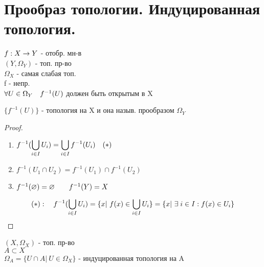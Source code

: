 \documentclass[geometry.tex]{subfiles}
\begin{document}
  \section{Прообраз топологии. Индуцированная топология.}

  \begin{definition}
      $f: X \rightarrow Y$ - отобр. мн-в\\
      $(Y, \Omega_Y)$ - топ. пр-во\\
      $\Omega_X$ - самая слабая топ.\\
      f - непр.\\
      $\forall U \in \Omega_Y \quad f^{-1}(U)$ должен быть открытым в X
  \end{definition}
  \begin{theorem}
      $\{f^{-1}(U)\}$ - топология на X и она назыв. прообразом $\Omega_Y$
  \end{theorem}

  \begin{proof}
      \begin{enumerate}
          \item $\displaystyle f^{-1}(\bigcup_{i \in I} U_i) = \bigcup_{i \in I} f^{-1}(U_i) \quad (*)$
          \item $f^{-1}(U_1 \cap U_2) = f^{-1}(U_1) \cap f^{-1}(U_2)$
          \item $f^{-1}(\varnothing) = \varnothing \quad\quad f^{-1}(Y) = X$
      \end{enumerate}
      \[(*): \quad f^{-1}(\bigcup_{i \in I} U_i) = \{x | \ f(x) \in \bigcup_{i \in I} U_i\} =
      \{x | \ \exists \; i \in I: f(x) \in U_i\}\]
  \end{proof}

  \begin{definition}
      $(X, \Omega_X)$ - топ. пр-во\\
      $A \subset X$\\
      $\Omega_A = \{U \cap A | \ U \in \Omega_X\}$ - индуцированная топология на A
  \end{definition}
\end{document}

